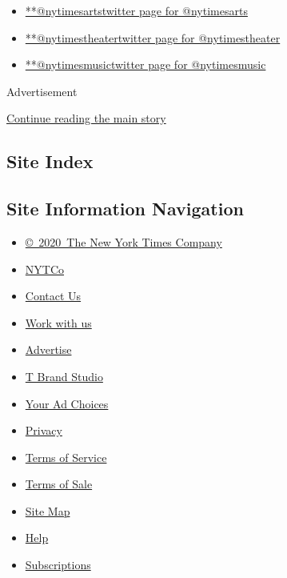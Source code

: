 \begin{itemize}
\tightlist
\item
  \href{https://twitter.com/nytimesarts}{**@nytimesartstwitter page for
  @nytimesarts}
\item
  \href{https://twitter.com/nytimestheater}{**@nytimestheatertwitter
  page for @nytimestheater}
\item
  \href{https://twitter.com/nytimesmusic}{**@nytimesmusictwitter page
  for @nytimesmusic}
\end{itemize}

Advertisement

\protect\hyperlink{after-mktg}{Continue reading the main story}

\hypertarget{site-index}{%
\subsection{Site Index}\label{site-index}}

\hypertarget{site-information-navigation}{%
\subsection{Site Information
Navigation}\label{site-information-navigation}}

\begin{itemize}
\tightlist
\item
  \href{https://help.nytimes3xbfgragh.onion/hc/en-us/articles/115014792127-Copyright-notice}{©~2020~The
  New York Times Company}
\end{itemize}

\begin{itemize}
\tightlist
\item
  \href{https://www.nytco.com/}{NYTCo}
\item
  \href{https://help.nytimes3xbfgragh.onion/hc/en-us/articles/115015385887-Contact-Us}{Contact
  Us}
\item
  \href{https://www.nytco.com/careers/}{Work with us}
\item
  \href{https://nytmediakit.com/}{Advertise}
\item
  \href{http://www.tbrandstudio.com/}{T Brand Studio}
\item
  \href{https://www.nytimes3xbfgragh.onion/privacy/cookie-policy\#how-do-i-manage-trackers}{Your
  Ad Choices}
\item
  \href{https://www.nytimes3xbfgragh.onion/privacy}{Privacy}
\item
  \href{https://help.nytimes3xbfgragh.onion/hc/en-us/articles/115014893428-Terms-of-service}{Terms
  of Service}
\item
  \href{https://help.nytimes3xbfgragh.onion/hc/en-us/articles/115014893968-Terms-of-sale}{Terms
  of Sale}
\item
  \href{https://spiderbites.nytimes3xbfgragh.onion}{Site Map}
\item
  \href{https://help.nytimes3xbfgragh.onion/hc/en-us}{Help}
\item
  \href{https://www.nytimes3xbfgragh.onion/subscription?campaignId=37WXW}{Subscriptions}
\end{itemize}

